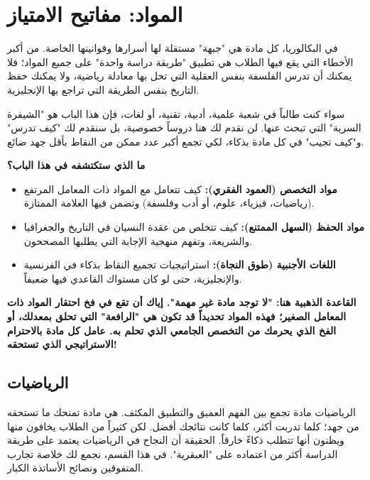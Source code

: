 \documentclass[12pt,a4paper]{book}
\newcommand{\importantAr}[1]{%
	\begin{important}
		\bfseries #1
	\end{important}
}
\begin{document}
	
	
	\chapter{المواد: مفاتيح الامتياز}
	\label{sec:owner-experiences10}
	\label{chap:scientific}
	

في البكالوريا، كل مادة هي "جبهة" مستقلة لها أسرارها وقوانينها الخاصة. من أكبر الأخطاء التي يقع فيها الطلاب هي تطبيق "طريقة دراسة واحدة" على جميع المواد؛ فلا يمكنك أن تدرس الفلسفة بنفس العقلية التي تحل بها معادلة رياضية، ولا يمكنك حفظ التاريخ بنفس الطريقة التي تراجع بها الإنجليزية.

سواء كنت طالباً في شعبة علمية، أدبية، تقنية، أو لغات، فإن هذا الباب هو "الشيفرة السرية" التي تبحث عنها. لن نقدم لك هنا دروساً خصوصية، بل سنقدم لك "كيف تدرس" و"كيف تجيب" في كل مادة بذكاء، لكي تجمع أكبر عدد ممكن من النقاط بأقل جهد ضائع.

\textbf{ما الذي ستكتشفه في هذا الباب؟}
\begin{itemize}
	\item \textbf{مواد التخصص (العمود الفقري):} كيف تتعامل مع المواد ذات المعامل المرتفع (رياضيات، فيزياء، علوم، أو أدب وفلسفة) وتضمن فيها العلامة الممتازة.
	\item \textbf{مواد الحفظ (السهل الممتنع):} كيف تتخلص من عقدة النسيان في التاريخ والجغرافيا والشريعة، وتفهم منهجية الإجابة التي يطلبها المصححون.
	\item \textbf{اللغات الأجنبية (طوق النجاة):} استراتيجيات تجميع النقاط بذكاء في الفرنسية والإنجليزية، حتى لو كان مستواك القاعدي فيها ضعيفاً.
\end{itemize}

\importantAr{القاعدة الذهبية هنا: "لا توجد مادة غير مهمة". إياك أن تقع في فخ احتقار المواد ذات المعامل الصغير؛ فهذه المواد تحديداً قد تكون هي "الرافعة" التي تحلق بمعدلك، أو الفخ الذي يحرمك من التخصص الجامعي الذي تحلم به. عامل كل مادة بالاحترام الاستراتيجي الذي تستحقه!}
	
	\section{الرياضيات}
	
	الرياضيات مادة تجمع بين الفهم العميق والتطبيق المكثف. هي مادة تمنحك ما تستحقه من جهد؛ كلما تدربت أكثر، كلما كانت نتائجك أفضل. لكن كثيراً من الطلاب يخافون منها ويظنون أنها تتطلب ذكاءً خارقاً. الحقيقة أن النجاح في الرياضيات يعتمد على طريقة الدراسة أكثر من اعتماده على "العبقرية". في هذا القسم، نجمع لك خلاصة تجارب المتفوقين ونصائح الأساتذة الكبار.
	
\end{document}
